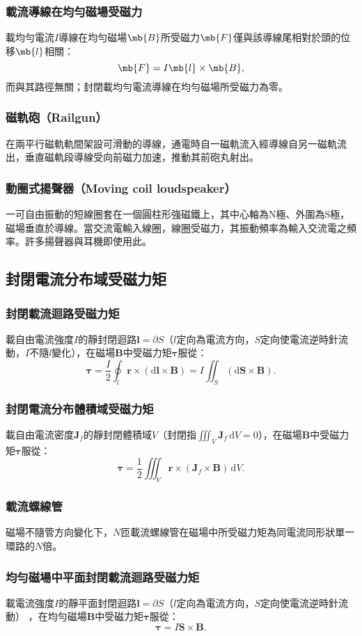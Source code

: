 \documentclass[a4paper,12pt]{report}
\begin{document}
\begin{itemize}
\subsubsection{載流導線在均勻磁場受磁力}
載均勻電流$I$導線在均勻磁場$\mb{B}$所受磁力$\mb{F}$僅與該導線尾相對於頭的位移$\mb{l}$相關：
\[\mb{F}=I\mb{l}\times\mb{B},\]
而與其路徑無關；封閉載均勻電流導線在均勻磁場所受磁力為零。
\subsubsection{磁軌砲（Railgun）}
在兩平行磁軌軌間架設可滑動的導線，通電時自一磁軌流入經導線自另一磁軌流出，垂直磁軌段導線受向前磁力加速，推動其前砲丸射出。
\subsubsection{動圈式揚聲器（Moving coil loudspeaker）}
一可自由振動的短線圈套在一個圓柱形強磁鐵上，其中心軸為N極、外圍為S極，磁場垂直於導線。當交流電輸入線圈，線圈受磁力，其振動頻率為輸入交流電之頻率。許多揚聲器與耳機即使用此。
\subsection{封閉電流分布域受磁力矩}
\subsubsection{封閉載流迴路受磁力矩}
載自由電流強度$I$的靜封閉迴路$\mathbf{l}=\partial S$（$l$定向為電流方向，$S$定向使電流逆時針流動，$I$不隨$l$變化），在磁場$\mathbf{B}$中受磁力矩$\boldsymbol{\tau}$服從：
\[\boldsymbol{\tau}=\frac{I}{2}\oint_l\mathbf{r}\times(\mathrm{d}\mathbf{l}\times\mathbf{B})=I\iint_S(\mathrm{d}\mathbf{S}\times\mathbf{B}).\]
\subsubsection{封閉電流分布體積域受磁力矩}
載自由電流密度$\mathbf{J}_f$的靜封閉體積域$V$（封閉指\(\iiint_V \mathbf{J}_f \, \mathrm{d}V = 0\)），在磁場$\mathbf{B}$中受磁力矩$\boldsymbol{\tau}$服從：
\[\boldsymbol{\tau}=\frac{1}{2}\iiint_V\mathbf{r}\times(\mathbf{J}_f\times\mathbf{B})\,\mathrm{d}V.\]
\subsubsection{載流螺線管}
磁場不隨管方向變化下，$N$匝載流螺線管在磁場中所受磁力矩為同電流同形狀單一環路的$N$倍。
\subsubsection{均勻磁場中平面封閉載流迴路受磁力矩}
載電流強度$I$的靜平面封閉迴路$\mathbf{l}=\partial S$（$l$定向為電流方向，$S$定向使電流逆時針流動）  ，在均勻磁場$\mathbf{B}$中受磁力矩$\boldsymbol{\tau}$服從：
\[\boldsymbol{\tau}=I\mathbf{S}\times\mathbf{B}.\]

\end{itemize}
\end{document}
